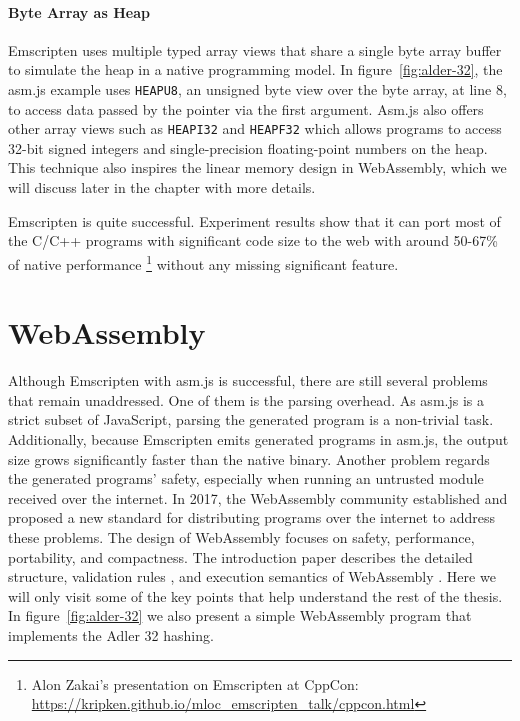 \paragraph{Byte Array as Heap}
Emscripten uses multiple typed array views that share a single byte array buffer
to simulate the heap in a native programming model. In
figure~\ref{fig:alder-32}, the asm.js example uses \texttt{HEAPU8}, an unsigned
byte view over the byte array, at line $8$, to access data passed by the pointer
via the first argument. Asm.js also offers other array views such as
\texttt{HEAPI32} and \texttt{HEAPF32} which allows programs to access 32-bit
signed integers and single-precision floating-point numbers on the heap. This
technique also inspires the linear memory design in WebAssembly, which we will
discuss later in the chapter with more details.

Emscripten is quite successful. Experiment results show that it can port most
of the C/C++ programs with significant code size to the web with around 50-67\%
of native performance
\footnote{Alon Zakai's presentation on Emscripten at CppCon:
\\\url{https://kripken.github.io/mloc_emscripten_talk/cppcon.html}} without
any missing significant feature.

\section{WebAssembly}

Although Emscripten with asm.js is successful, there are still several problems
that remain unaddressed. One of them is the parsing overhead. As asm.js is a
strict subset of JavaScript, parsing the generated program is a non-trivial
task. Additionally, because Emscripten emits generated programs in asm.js, the
output size grows significantly faster than the native binary. Another
problem regards the generated programs' safety, especially when running an
untrusted module received over the internet. In 2017, the WebAssembly community
established and proposed a new standard for distributing programs over the
internet to address these problems. The design of WebAssembly focuses on
safety, performance, portability, and compactness. The introduction paper
describes the detailed structure, validation rules \cite{10.1145/3167082}, and
execution semantics of WebAssembly \cite{10.1145/3062341.3062363}. Here we will
only visit some of the key points that help understand the rest of the thesis.
In figure~\ref{fig:alder-32} we also present a simple WebAssembly program that
implements the Adler 32 hashing.

